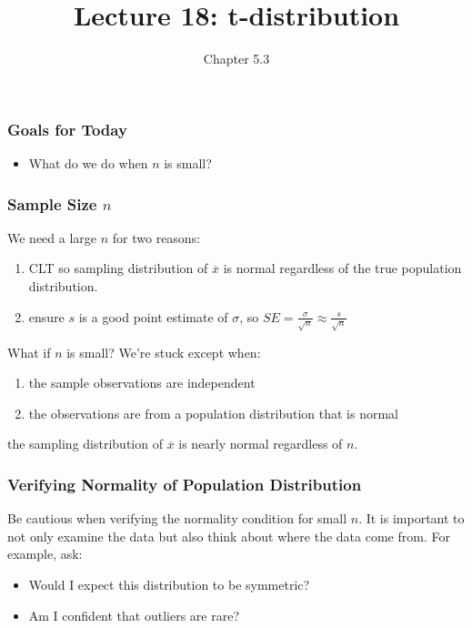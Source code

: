 \documentclass[handout]{beamer}
\title{Lecture 18: t-distribution}
\author{Chapter 5.3}
\date{}
\newcommand{\blue}[1]{\textcolor{blue2}{#1}}
\newcommand{\xbar}{\overline{x}}
\begin{document}
\begin{frame}
\titlepage
\end{frame}


\begin{frame}[fragile]
\frametitle{Goals for Today}

\begin{itemize}
\item What do we do when $n$ is small?  
\end{itemize}

\end{frame}


\begin{frame}[fragile]
\frametitle{Sample Size $n$}
We need a \blue{large $n$} for two reasons:

\begin{enumerate}
\item CLT so sampling distribution of $\xbar$ is normal regardless of the true population distribution. 
\item ensure $s$ is a good point estimate of $\sigma$, so $SE = \frac{\sigma}{\sqrt{n}} \approx \frac{s}{\sqrt{n}}$
\end{enumerate}

\pause \vspace{0.5cm}

What if $n$ is small?  We're stuck \blue{except when}: 
\begin{enumerate}
\item the sample observations are independent
\item the observations are from a population distribution that is normal
\end{enumerate}
the sampling distribution of $\xbar$ is nearly normal \blue{regardless} of $n$.

\end{frame}


\begin{frame}[fragile]
\frametitle{Verifying Normality of Population Distribution}

Be cautious when verifying the normality condition for small $n$. It is important to not only examine the data but also think about where the data come from. For example, ask:
\begin{itemize}
\item Would I expect this distribution to be symmetric?
\item Am I confident that outliers are rare?
\end{itemize}

\end{frame}
\end{document}

